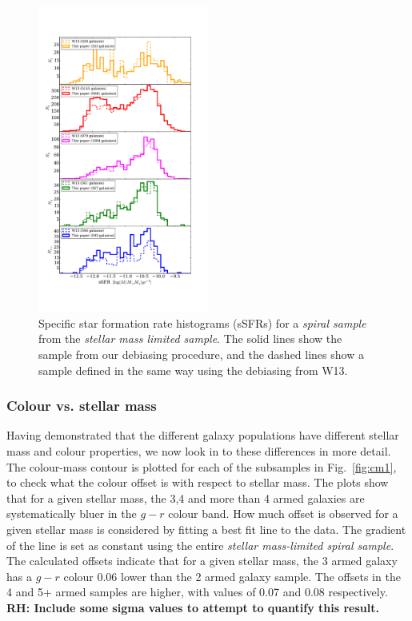 \documentclass[useAMS,usenatbib]{mn2e}
\newcommand{\rh}[1]{{\bf \textcolor{RoyalPurple}{RH: #1}}}
\begin{document}
\begin{figure}
		\centering

        \includegraphics[width=0.5\textwidth]{Histograms/ssfr_histogram.pdf}

        \caption{Specific star formation rate histograms (sSFRs) for a \textit{spiral sample} from the \textit{stellar mass limited sample}. The solid lines show the sample from our debiasing procedure, and the dashed lines show a sample defined in the same way using the debiasing from W13.}

        \label{fig:ssfr_histogram}

\end{figure}

\subsubsection{Colour vs. stellar mass}
\label{sec:colour_mass}

Having demonstrated that the different galaxy populations have different stellar mass and colour properties, we now look in to these differences in more detail. The colour-mass contour is plotted for each of the subsamples in Fig.~\ref{fig:cm1}, to check what the colour offset is with respect to stellar mass. The plots show that for a given stellar mass, the 3,4 and more than 4 armed galaxies are systematically bluer in the $g-r$ colour band. How much offset is observed for a given stellar mass is considered by fitting a best fit line to the data. The gradient of the line is set as constant using the entire \textit{stellar mass-limited spiral sample}. The calculated offsets indicate that for a given stellar mass, the 3 armed galaxy has a $g-r$ colour 0.06 lower than the 2 armed galaxy sample. The offsets in the 4 and 5+ armed samples are higher, with values of 0.07 and 0.08 respectively. \rh{Include some sigma values to attempt to quantify this result.}
\end{document}
